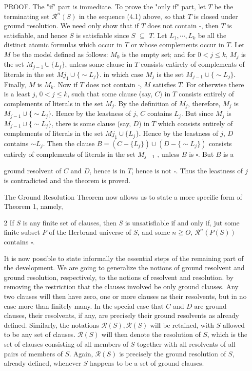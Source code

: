 \documentclass[8pt]{extarticle}
\begin{document}
PROOF. The "if" part is immediate. To prove the "only if" part, let $T$ be the
terminating set $\mathscr{R}^n(S)$ in the sequence (4.1) above, so that $T$ is closed under ground resolution. We need only show that if $T$ does not contain $\square$, then $T$ is satisfiable, and hence $S$ is satisfiable since $S$ $\subseteq$ $T$. Let $L_1, \dotsm , L_k$ be all the distinct atomic formulas which occur in $T$ or whose complements occur in $T$. Let $M$ be the model defined as follows: $M_0$ is the empty set; and for $0 < j \leq k$, $M_j$ is the set $M_{j-1} \cup \{L_j\}$, unless some clause in $T$ consists entirely of complements of literals in the set $M{j_1}\cup\{\sim L_j\}$. in which case $M_j$ is the set $M_{j-1}\cup\{\sim L_j\}$. Finally, $M$ is $M_k$. Now if $T$ does not contain $\square$, $M$ satisfies $T$. For otherwise there is a least $j$, $0 < j \leq k$, such that some clause (say, $C$) in $T$ consists entirely of complements of literals in the set $M_j$. By the definition of $M_j$, therefore, $M_j$ is $M_{j-1} \cup \{\sim L_j\}$. Hence by the leastness of $j$, $C$ contains $L_j$. But since $M_j$ is $M_{j-1}\cup \{\sim L_j\}$, there is some clause (say, $D$) in $T$ which consists entirely of complements of literals in the set $M{j_1}\cup \{L_j\}$. Hence by the leastness of $j$, $D$ contains $\sim L_j$. Then the clause $B = (C - \{L_j\}) \cup (D - \{\sim L_j\})$ consists entirely of complements of literals in the set $M_{j-1}$ , unless $B$ is $\square$. But $B$ is a

\newpage

ground resolvent of $C$ and $D$, hence is in $T$, hence is not $\square$. Thus the leastness of $j$ is contradicted and the theorem is proved.

The Ground Resolution Theorem now allows us to state a more specific form
of Theorem 1, namely,


\begin{p7theorem}{2}\label{two}
If $S$ is any finite set of clauses, then $S$ is unsatisfiable if and only
if, jut some finite subset $P$ of the Herbrand universe of $S$, and some $n \geqq O$, $\mathscr{R}^n(P(S))$ contains $\square$.
\end{p7theorem}

It is now possible to state informally the essential steps of the remaining part of the development. We are going to generalize the notions of ground resolvent and ground resolution, respectively, to the notions of resolvent and resolution. by removing the restriction that the clauses involved be only ground clauses. Any two clauses will then have zero, one or more clauses as their resolvents, but in no case more than finitely many. In the special ease that $C$ and $D$ are ground clauses, their resolvents, if any, are precisely their ground resolvents as already defined. Similarly, the notations $\mathscr{R}(S), \mathscr{R}(S)$ will be retained, with $S$ allowed to be any set of clauses. $\mathscr{R}(S)$ will then denote the resolution of $S$, which
is the set of clauses consisting of all members of $S$ together with all resolvents of all pairs of members of $S$. Again, $\mathscr{R}(S)$ is precisely the ground resolution of $S$, already defined, whenever $S$ happens to be a set of ground clauses. 
\end{document}

